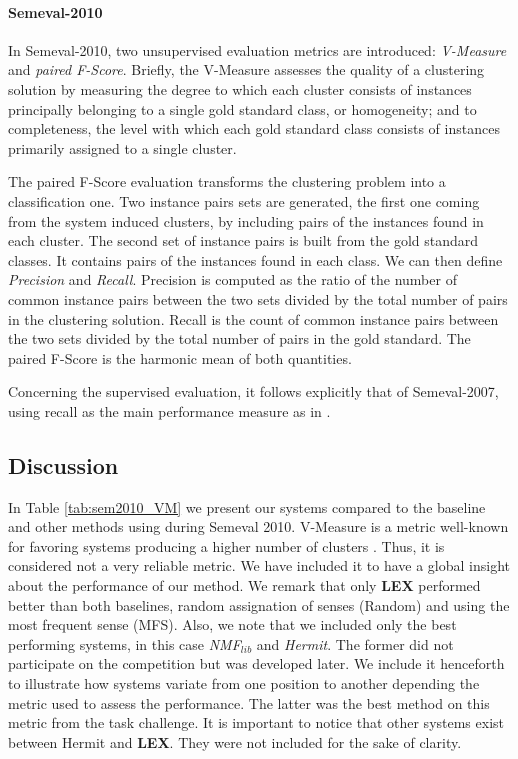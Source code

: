 

\paragraph{Semeval-2010}
In Semeval-2010, two unsupervised evaluation metrics are introduced: \textit{V-Measure} and \textit{paired F-Score}. Briefly, the V-Measure assesses the quality of a clustering solution by measuring the degree to which each cluster consists of instances principally belonging to a single gold standard class, or homogeneity; and to completeness, the level with which each gold standard class consists of instances primarily assigned to a single cluster.

The paired F-Score evaluation transforms the clustering problem into a classification one. Two instance pairs sets are generated, the first one coming from the system induced clusters, by including pairs of the instances found in each cluster. The second set of instance pairs is built from the gold standard classes. It contains pairs of the instances found in each class. We can then define \textit{Precision} and \textit{Recall}. Precision is computed as the ratio of the number of common instance pairs between the two sets divided by the total number of pairs in the clustering solution. Recall is the count of common instance pairs between the two sets divided by the total number of pairs in the gold standard. The paired F-Score is the harmonic mean of both quantities.

Concerning the supervised evaluation, it follows explicitly that of Semeval-2007, using recall as the main performance measure as in  \cite{Semeval2010,VandeCruys2011,pedersen2010duluth}.

\subsection{Discussion}
In Table \ref{tab:sem2010_VM} we present our systems compared to the baseline and other methods using during Semeval 2010. V-Measure is a metric well-known for favoring systems producing a higher number of clusters \cite{VandeCruys2011,pedersen2010duluth}. Thus, it is considered not a very reliable metric. We have included it to have a global insight about the performance of our method. We remark that only \textbf{LEX} performed better than both baselines, random assignation of senses (Random) and using the most frequent sense (MFS). Also, we note that we included only the best performing systems, in this case \textit{NMF$_{lib}$} and  \textit{Hermit}. The former  did not participate on the competition but was developed later. We include it henceforth to illustrate how systems variate from one position to another depending the metric used to assess the performance. The latter was the best method on this metric from the task challenge. It is important to notice that other systems exist between Hermit and \textbf{LEX}. They were not included for the sake of clarity.

